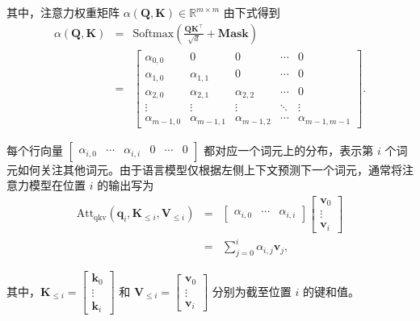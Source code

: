 \noindent 其中，注意力权重矩阵 $\alpha(\mathbf{Q},\mathbf{K}) \in \mathbb{R}^{m \times m}$ 由下式得到
\begin{eqnarray}
\alpha(\mathbf{Q},\mathbf{K}) & = & \mathrm{Softmax}(\frac{\mathbf{Q} \mathbf{K}^\top}{\sqrt{d}} + \mathbf{Mask}) \nonumber \\
                              & = & \begin{bmatrix} \alpha_{0,0} & 0 & 0 & \cdots & 0 \\ \alpha_{1,0} & \alpha_{1,1} & 0 & \cdots & 0 \\ \alpha_{2,0} & \alpha_{2,1} & \alpha_{2,2} & \cdots & 0 \\ \vdots & \vdots & \vdots & \ddots & \vdots \\ \alpha_{m-1,0} & \alpha_{m-1,1} & \alpha_{m-1,2} & \cdots & \alpha_{m-1,m-1} \end{bmatrix}.
\end{eqnarray}

每个行向量 $\begin{bmatrix} \alpha_{i,0} & \cdots & \alpha_{i,i} & 0 & \cdots & 0 \end{bmatrix}$ 都对应一个词元上的分布，表示第 $i$ 个词元如何关注其他词元。由于语言模型仅根据左侧上下文预测下一个词元，通常将注意力模型在位置 $i$ 的输出写为
\begin{eqnarray}
\mathrm{Att}_{\mathrm{qkv}}(\mathbf{q}_i,\mathbf{K}_{\le i},\mathbf{V}_{\le i}) & = & \begin{bmatrix} \alpha_{i,0} & \cdots & \alpha_{i,i}  \end{bmatrix} \begin{bmatrix} \mathbf{v}_0 \\ \vdots \\ \mathbf{v}_{i} \end{bmatrix} \nonumber \\
                                                                                & = & \sum_{j = 0}^{i} \alpha_{i,j} \mathbf{v}_{j},
\end{eqnarray}

\noindent 其中，$\mathbf{K}_{\le i} = \begin{bmatrix} \mathbf{k}_0 \\ \vdots \\ \mathbf{k}_{i} \end{bmatrix}$ 和 $\mathbf{V}_{\le i} = \begin{bmatrix} \mathbf{v}_0 \\ \vdots \\ \mathbf{v}_{i} \end{bmatrix}$ 分别为截至位置 $i$ 的键和值。

